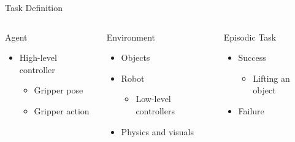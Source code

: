 \begin{frame}{Task Definition}{}
    \begin{columns}%
        \begin{column}{0.32\textwidth}%
            \begin{block}{Agent}
                \begin{itemize}
                    \item High-level controller
                          \begin{itemize}
                              \item Gripper pose
                              \item Gripper action
                          \end{itemize}
                \end{itemize}
            \end{block}
        \end{column}
        \begin{column}{0.32\textwidth}%
            \begin{block}{Environment}
                \begin{itemize}
                    \item Objects
                    \item Robot
                          \begin{itemize}
                              \item Low-level controllers
                          \end{itemize}
                    \item Physics and visuals
                \end{itemize}
            \end{block}
        \end{column}
        \begin{column}{0.35\textwidth}%
            \begin{block}{Episodic Task}
                \begin{itemize}
                    \item Success
                          \begin{itemize}
                              \item Lifting an object
                          \end{itemize}
                    \item Failure
                          \begin{itemize}

\end{itemize}
\end{itemize}
\end{block}
\end{column}
\end{columns}
\end{frame}
